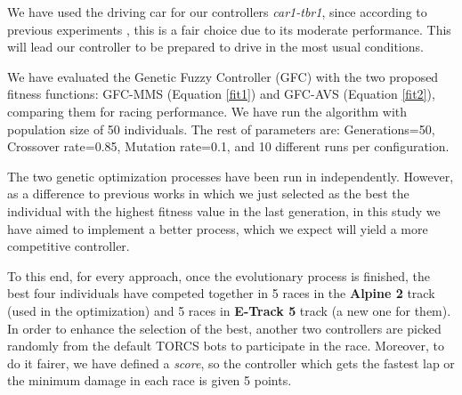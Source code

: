\documentclass[conference]{IEEEtran}
\begin{document}
We have used the driving car for our controllers \textit{car1-tbr1}, since according to previous experiments \cite{evo17}, this is a fair choice due to its moderate performance. This will lead our controller to be prepared to drive in the most usual conditions. 

We have evaluated the Genetic Fuzzy Controller (GFC) with the two proposed fitness functions: GFC-MMS (Equation \ref{fit1}) and GFC-AVS (Equation \ref{fit2}), comparing them for racing performance. We have run the  algorithm with population size of 50 individuals. The rest of parameters are: Generations=50, Crossover rate=0.85, Mutation rate=0.1, and 10 different runs per configuration.



The two genetic optimization processes have been run in independently. However, as a difference to previous works in which we just selected as the best the individual with the highest fitness value in the last generation, in this study we have aimed to implement a better process, which we expect will yield a more competitive controller.

To this end, for every approach, once the evolutionary process is
finished, the best four individuals have competed together in 5 races
in the \textbf{Alpine 2} track (used in the optimization) and 5 races in \textbf{E-Track 5} track (a new one for them). 
In order to enhance the selection of the best, another two controllers are picked randomly from the default TORCS bots
to participate in the race. Moreover, to do it fairer, we have defined a \textit{score}, so the controller which gets the fastest lap or the minimum damage in each race is given 5 points.
\end{document}
